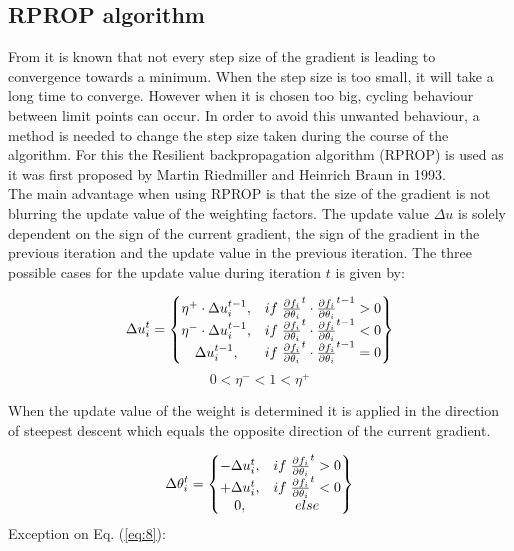 
\subsection{RPROP algorithm}\label{s:RPROP}
From \cite{Panos_opti} it is known that not every step size of the gradient is leading to convergence towards a minimum. When the step size is too small, it will take a long time to converge. However when it is chosen too big, cycling behaviour between limit points can occur. In order to avoid this unwanted behaviour, a  method is needed to change the step size taken during the course of the algorithm. For this the Resilient backpropagation algorithm (RPROP) \cite{RPROP} is used as it was first proposed by Martin Riedmiller and Heinrich Braun in 1993.\\

The main advantage when using RPROP is that the size of the gradient is not blurring the update value of the weighting factors. The update value $\Delta u$ is solely dependent on the sign of the current gradient, the sign of the gradient in the previous iteration and the update value in the previous iteration. The three possible cases for the update value during iteration $t$ is given by: 

\begin{equation}\label{eq:7}
	\Delta u^t_i =
	\begin{Bmatrix}
		 \eta^+ \cdot \Delta u^{t-1}_i, & if \hspace{1 mm} \pdv{f_i}{\theta_i}^t \cdot \pdv{f_i}{\theta_i}^{t-1} > 0 \\
		 \eta^- \cdot \Delta u^{t-1}_i, & if \hspace{1 mm} \pdv{f_i}{\theta_i}^t \cdot \pdv{f_i}{\theta_i}^{t-1} < 0 \\
		  \Delta u^{t-1}_i, & if \hspace{1 mm} \pdv{f_i}{\theta_i}^t \cdot \pdv{f_i}{\theta_i}^{t-1} = 0 \\
	\end{Bmatrix}
\end{equation}
\begin{equation}\label{eq:9}
0 <\eta^-<1<\eta^+
\end{equation}

When the update value of the weight is determined it is applied in the direction of steepest descent which equals the opposite direction of the current gradient. 

\begin{equation}\label{eq:8}
\Delta \theta^t_i =
\begin{Bmatrix}
	-\Delta u^t_i, & if \hspace{1 mm} \pdv{f_i}{\theta_i}^t > 0 \\
	+ \Delta u^t_i, & if \hspace{1 mm} \pdv{f_i}{\theta_i}^t < 0 \\
	0, & else 
\end{Bmatrix}
\end{equation}
Exception on Eq. (\ref{eq:8}):

